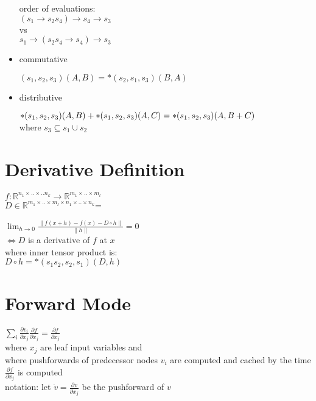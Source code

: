 \documentclass[8pt]{extarticle}
\newcommand{\R}{\mathbb{R}}
\begin{document}
\begin{multicols*}{2}
\begin{itemize}
    order of evaluations:\\
    $(s_1 \rightarrow s_2 s_4) \rightarrow s_4 \rightarrow s_3$\\
    vs\\
    $s_1 \rightarrow (s_2 s_4 \rightarrow s_4) \rightarrow s_3$
     
    \item commutative

      $(s_1,s_2,s_3)(A,B) = *(s_2,s_1,s_3)(B,A)$
    
    \item distributive

      $*(s_1,s_2,s_3)(A,B) + *(s_1,s_2,s_3)(A,C)\\= *(s_1,s_2,s_3)(A, B+C)$\\
      where $s_3 \subseteq s_1 \cup s_2$

  \end{itemize}

  \section{Derivative Definition}

  $f: \R^{n_1 \times .. \times .. n_k} \rightarrow \R^{m_1 \times .. \times m_l}$\\
  $D \in \R^{m_1 \times .. \times m_l \times n_1 \times .. \times n_k}$=

  $\lim_{h \rightarrow 0} \frac{\| f(x+h) - f(x) - D \circ h\|}{\| h \|} = 0$\\
  $\iff D$ is a derivative of $f$ at $x$\\
  
  where inner tensor product is: \\
  $D \circ h = *(s_1 s_2, s_2, s_1)(D,h)$

  \vfill\null
  \columnbreak
    
  \section{Forward Mode}
  $\sum_{i} \frac{ \partial v_i}{\partial x_j} \frac{\partial f}{\partial x_j} = \frac{\partial f}{\partial x_j}$\\
  where $x_j$ are leaf input variables and\\
  where pushforwards of predecessor nodes $v_i$ are computed and cached by the time $\frac{\partial f}{\partial x_j}$ is computed\\
  
  notation: let $\dot{v} = \frac{\partial v}{\partial x_j}$ be the pushforward of $v$


\end{multicols*}
\end{document}
